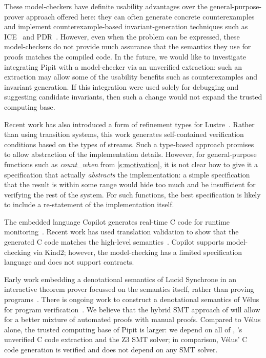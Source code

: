 \documentclass[a4paper,UKenglish,cleveref, autoref, thm-restate,anonymous]{lipics-v2021}
\begin{document}
These model-checkers have definite usability advantages over the general-purpose-prover approach offered here: they can often generate concrete counterexamples and implement counterexample-based invariant-generation techniques such as ICE~\cite{garg2014ice} and PDR~\cite{bradley2011sat,een2011efficient}.
However, even when the problem can be expressed, these model-checkers do not provide much assurance that the semantics they use for proofs matches the compiled code.
In the future, we would like to investigate integrating Pipit with a model-checker via an unverified extraction: such an extraction may allow some of the usability benefits such as counterexamples and invariant generation.
If this integration were used solely for debugging and suggesting candidate invariants, then such a change would not expand the trusted computing base.

Recent work has also introduced a form of refinement types for Lustre~\cite{chen2022synchronous}.
Rather than using transition systems, this work generates self-contained verification conditions based on the types of streams.
Such a type-based approach promises to allow abstraction of the implementation details.
However, for general-purpose functions such as \emph{count_when} from \autoref{s:motivation}, it is not clear how to give it a specification that actually \emph{abstracts} the implementation: a simple specification that the result is within some range would hide too much and be insufficient for verifying the rest of the system.
For such functions, the best specification is likely to include a re-statement of the implementation itself.

The embedded language Copilot generates real-time C code for runtime monitoring~\cite{laurent2015assuring}.
Recent work has used translation validation to show that the generated C code matches the high-level semantics~\cite{scott2023trustworthy}.
Copilot supports model-checking via Kind2; however, the model-checking has a limited specification language and does not support contracts.

Early work embedding a denotational semantics of Lucid Synchrone in an interactive theorem prover focussed on the semantics itself, rather than proving programs~\cite{boulme2001clocked}.
There is ongoing work to construct a denotational semantics of Vélus for program verification~\cite{bourke2022towards}.
We believe that the hybrid SMT approach of \fstar{} will allow for a better mixture of automated proofs with manual proofs.
Compared to Vélus alone, the trusted computing base of Pipit is larger: we depend on all of \fstar{}, \lowstar{}'s unverified C code extraction and the Z3 SMT solver; in comparison, Vélus' C code generation is verified and does not depend on any SMT solver.
\end{document}
